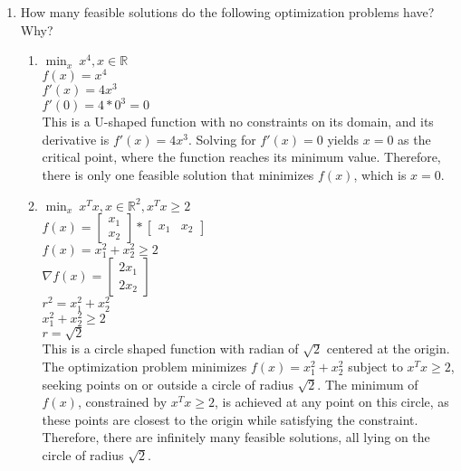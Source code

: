 \documentclass{assignment}
\newcommand{\R}{\mathbb{R}}
\begin{document}
\begin{problem}
\begin{enumerate}
\item How many feasible solutions do the following optimization problems have? Why?\\
\begin{enumerate} 

\item $ \min_x\ x^4, x \in \R$\\

    $f(x) = x^4$\\

    $f'(x) = 4x^3$\\

    $f'(0) = 4*0^3 = 0$\\
    
    This is a U-shaped function with no constraints on its domain, and its derivative is $f'(x) = 4x^3$. Solving for $f'(x) = 0$ yields $x=0$ as the critical point, where the function reaches its minimum value. Therefore, there is only one feasible solution that minimizes $f(x)$, which is $x=0$.\\
    

\item $ \min_x\ x^T x, x \in \R^2, x^Tx \geq 2$\\

    $f(x) = \begin{bmatrix}
        x_1\\x_2
    \end{bmatrix} * \begin{bmatrix}
        x_1&x_2
    \end{bmatrix}$\\

    $f(x) = x^2_1 + x^2_2 \geq 2$\\

    $\nabla f(x) = \begin{bmatrix}
        2x_1\\2x_2
    \end{bmatrix}$\\

    $r^2 = x^2_1 + x^2_2$\\
    $x^2_1 + x^2_2 \geq 2$\\
    $r = \sqrt{2}$\\
    
    This is a circle shaped function with radian of $\sqrt{2}$ centered at the origin. The optimization problem minimizes $f(x) = x_1^2 + x_2^2$ subject to $x^Tx \geq 2$, seeking points on or outside a circle of radius $\sqrt{2}$. The minimum of $f(x)$, constrained by $x^Tx \geq 2$, is achieved at any point on this circle, as these points are closest to the origin while satisfying the constraint. Therefore, there are infinitely many feasible solutions, all lying on the circle of radius $\sqrt{2}$.\\


\end{enumerate}
\end{enumerate}
\end{problem}
\end{document}
